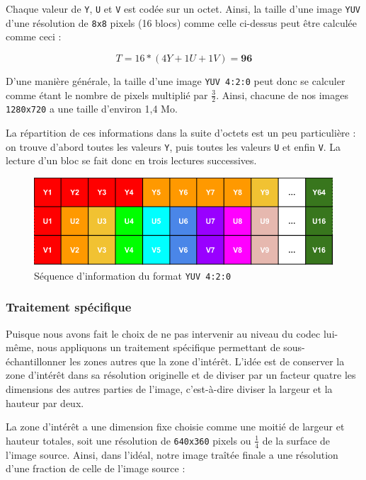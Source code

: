 \documentclass[11pt,a4paper]{article}
\begin{document}
\bigbreak
Chaque valeur de \texttt{Y}, \texttt{U} et \texttt{V} est codée sur un octet.
Ainsi, la taille d'une image \texttt{YUV} d'une résolution de \texttt{8x8} pixels (16 blocs) comme celle ci-dessus peut être calculée comme ceci :

$$ T = 16 * (4Y + 1U + 1V) = \mathbf{96}$$

\bigbreak

D'une manière générale, la taille d'une image \texttt{YUV 4:2:0} peut donc se calculer comme étant le nombre de pixels multiplié par $\frac{3}{2}$.
Ainsi, chacune de nos images \texttt{1280x720} a une taille d'environ 1,4 Mo.

\bigbreak
La répartition de ces informations dans la suite d'octets est un peu particulière : on trouve d'abord toutes les valeurs \texttt{Y}, puis toutes les valeurs \texttt{U} et enfin \texttt{V}.
La lecture d'un bloc se fait donc en trois lectures successives.

\begin{figure}[H]
\begin{center}
\includegraphics[scale=0.5]{images/yuv2.png}
\end{center}
\caption{Séquence d'information du format \texttt{YUV 4:2:0}}
\label{}
\end{figure}

\bigbreak

\subsubsection{Traitement spécifique}

Puisque nous avons fait le choix de ne pas intervenir au niveau du codec lui-même, nous appliquons un traitement spécifique permettant de sous-échantillonner les zones autres que la zone d'intérêt.
L'idée est de conserver la zone d'intérêt dans sa résolution originelle et de diviser par un facteur quatre les dimensions des autres parties de l'image, c'est-à-dire diviser la largeur et la hauteur par deux.

\bigbreak
La zone d'intérêt a une dimension fixe choisie comme une moitié de largeur et hauteur totales, soit une résolution de \texttt{640x360} pixels ou $\frac{1}{4}$ de la surface de l'image source.
Ainsi, dans l'idéal, notre image traîtée finale a une résolution d'une fraction de celle de l'image source :
\end{document}
